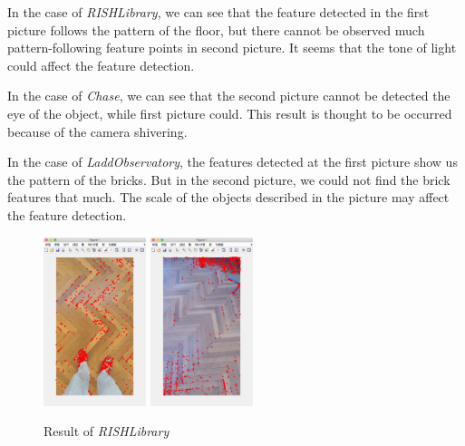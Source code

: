 In the case of \textit{RISHLibrary}, we can see that the feature detected in the first picture follows the pattern of the floor, 
but there cannot be observed much pattern-following feature points in second picture. It seems that the tone of light could affect the feature detection.

In the case of \textit{Chase}, we can see that the second picture cannot be detected the eye of the object, while first picture could.
This result is thought to be occurred because of the camera shivering.

In the case of \textit{LaddObservatory}, the features detected at the first picture show us the pattern of the bricks. But in the second picture, we could not find the brick features that much.
The scale of the objects described in the picture may affect the feature detection.

\begin{figure}[!hp]
  \centering
  \includegraphics[width=3cm]{ri1.png}
  \includegraphics[width=3cm]{ri2.png}
  \caption{Result of \textit{RISHLibrary}}
  \label{fig:RISHLibrary}
\end{figure}

